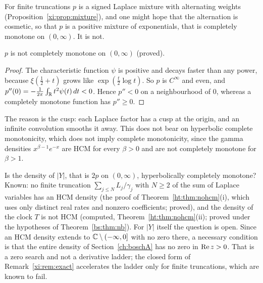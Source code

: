 For finite truncations $p$ is a signed Laplace mixture with alternating weights (Proposition~\ref{xi:prop:mixture}), and one might hope that the alternation is cosmetic, so that $p$ is a positive mixture of exponentials, that is completely monotone on $(0,\infty)$. It is not.

\begin{proposition}\label{xi:prop:notCM}
$p$ is not completely monotone on $(0,\infty)$ (proved).
\end{proposition}

\begin{proof}
The characteristic function $\psi$ is positive and decays faster than any power, because $\xi(\frac12+t)$ grows like $\exp(\frac t2\log t)$. So $p$ is $C^\infty$ and even, and $p''(0)=-\frac1{2\pi}\int_{\mathbb{R}} t^2\psi(t)\,dt<0$. Hence $p''<0$ on a neighbourhood of $0$, whereas a completely monotone function has $p''\ge0$.
\end{proof}

The reason is the cusp: each Laplace factor has a cusp at the origin, and an infinite convolution smooths it away. This does not bear on hyperbolic complete monotonicity, which does not imply complete monotonicity, since the gamma densities $x^{\beta-1}e^{-x}$ are HCM for every $\beta>0$ and are not completely monotone for $\beta>1$.

\begin{problem}\label{xi:prob:hcm}
Is the density of $|Y|$, that is $2p$ on $(0,\infty)$, hyperbolically completely monotone? Known: no finite truncation $\sum_{j\le N}L_j/\gamma_j$ with $N\ge2$ of the sum of Laplace variables has an HCM density (the proof of Theorem~\ref{ht:thm:nohcm}(i), which uses only distinct real rates and nonzero coefficients; proved), and the density of the clock $T$ is not HCM (computed, Theorem~\ref{ht:thm:nohcm}(ii); proved under the hypotheses of Theorem~\ref{bs:thm:nb}). For $|Y|$ itself the question is open. Since an HCM density extends to $\mathbb{C}\setminus(-\infty,0]$ with no zero there, a necessary condition is that the entire density of Section~\ref{ch:boschA} has no zero in $\operatorname{Re} z>0$. That is a zero search and not a derivative ladder; the closed form of Remark~\ref{xi:rem:exact} accelerates the ladder only for finite truncations, which are known to fail.
\end{problem}

